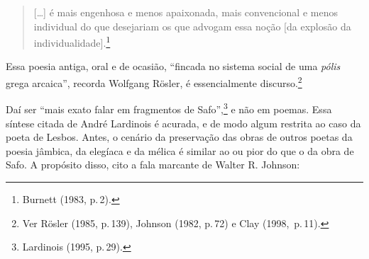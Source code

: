 \begin{quote}
{[}\ldots{}{]} é mais engenhosa e menos apaixonada,
mais convencional e menos individual do que desejariam os que advogam essa noção {[}da explosão da individualidade{]}.\footnote{ Burnett (1983, p.\,2).} 
\end{quote}

Essa poesia antiga, oral e de
ocasião, “fincada no sistema social de uma \emph{pólis} grega arcaica”,
recorda Wolfgang Rösler, é essencialmente discurso.\footnote{ Ver
Rösler (1985, p.\,139), Johnson (1982, p.\,72) e Clay \mbox{(1998, p.\,11)}.}


\begin{quote}
\end{quote}

Daí ser “mais exato
falar em fragmentos de Safo”,\footnote{ Lardinois (1995, p.\,29).} e não em
poemas. Essa síntese citada de André Lardinois é acurada, e de modo algum restrita ao
caso da poeta de Lesbos.
Antes, o cenário da preservação das obras de outros poetas da poesia jâmbica, da elegíaca e da mélica é similar ao ou pior do que
o da obra de Safo. A propósito disso, cito a fala marcante de Walter R. Johnson:

